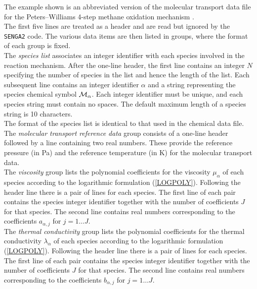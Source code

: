\documentclass[dvips]{article}
\begin{document}
The example shown is an abbreviated version of the molecular transport
data file for the
Peters--Williams 4-step methane oxidation mechanism \cite{PW87}.\\

\noindent
The first five lines are treated as a header and are read but ignored by
the {\tt SENGA2} code.  The various data items are then listed in groups,
where the format of each group is fixed.\\

\noindent
The {\it species list} associates an integer identifier with each species
involved in the reaction mechanism.  After the one-line header, the
first line contains an integer $N$ specifying the number of species in the
list and hence the length of the list.  Each subsequent line contains an
integer identifier $\alpha$ and a
string representing the species chemical symbol ${\cal M}_{\alpha}$.
Each integer identifier must be unique, and each species string must contain
no spaces.  The default maximum length of a species string is 10 characters.\\
The format of the species list is identical to that used in the chemical data
file.\\

\noindent
The {\it molecular transport reference data} group consists of a one-line
header followed by a line containing two real numbers.  These provide the
reference pressure (in Pa) and the reference temperature (in K) for the
molecular transport data.\\

\noindent
The {\it viscosity} group lists the polynomial coefficients for the viscosity
$\mu_{\alpha}$ of each species according to the logarithmic formulation
(\ref{LOGPOLY}).  Following the header line there is a pair of lines for each
species.  The first line of each pair contains the species integer identifier
together with the number of coefficients $J$ for that species.  The second
line contains real numbers corresponding to the coefficients
$a_{\alpha,j}$ for $j=1\ldots J$.\\

\noindent
The {\it thermal conductivity} group lists the polynomial coefficients for
the thermal conductivity $\lambda_{\alpha}$
of each species according to the logarithmic formulation (\ref{LOGPOLY}).
Following the header line there is a pair of lines for each
species.  The first line of each pair contains the species integer identifier
together with the number of coefficients $J$ for that species.  The second
line contains real numbers corresponding to the coefficients
$b_{\alpha,j}$ for $j=1\ldots J$.\\
\end{document}
